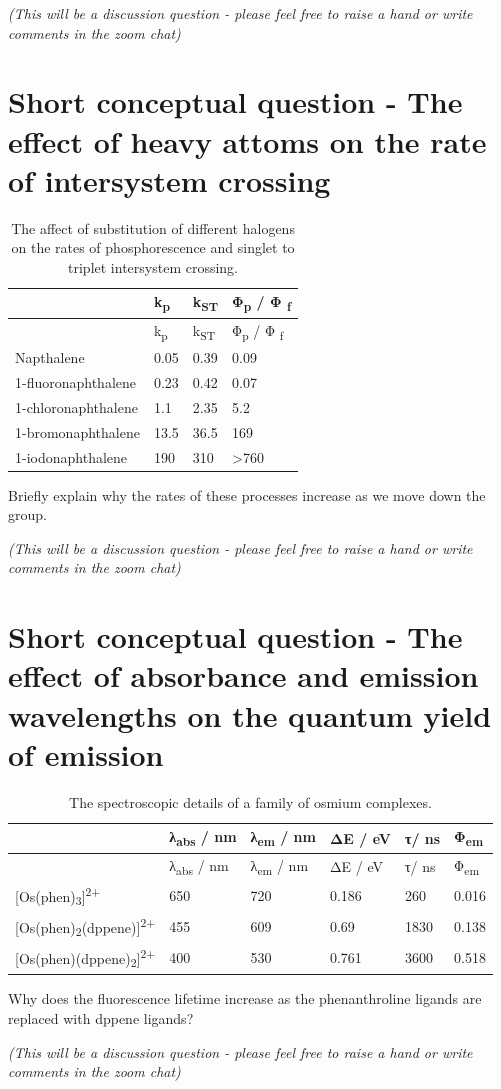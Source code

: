\documentclass[
]{book}
\begin{document}
\emph{(This will be a discussion question - please feel free to raise a hand or write comments in the zoom chat)}

\hypertarget{sec:heavy}{%
\section{Short conceptual question - The effect of heavy attoms on the rate of intersystem crossing}\label{sec:heavy}}

\begin{longtable}[]{@{}llll@{}}
\caption{\label{tab:heavyatom} The affect of substitution of different halogens on the rates of phosphorescence and singlet to triplet intersystem crossing.}\tabularnewline
\toprule
& k\textsubscript{p} & k\textsubscript{ST} & Φ\textsubscript{p} / Φ \textsubscript{f}\tabularnewline
\midrule
\endfirsthead
\toprule
& k\textsubscript{p} & k\textsubscript{ST} & Φ\textsubscript{p} / Φ \textsubscript{f}\tabularnewline
\midrule
\endhead
Napthalene & 0.05 & 0.39 & 0.09\tabularnewline
1-fluoronaphthalene & 0.23 & 0.42 & 0.07\tabularnewline
1-chloronaphthalene & 1.1 & 2.35 & 5.2\tabularnewline
1-bromonaphthalene & 13.5 & 36.5 & 169\tabularnewline
1-iodonaphthalene & 190 & 310 & \textgreater760\tabularnewline
\bottomrule
\end{longtable}

Briefly explain why the rates of these processes increase as we move down the group.

\emph{(This will be a discussion question - please feel free to raise a hand or write comments in the zoom chat)}

\hypertarget{sec:osphen}{%
\section{Short conceptual question - The effect of absorbance and emission wavelengths on the quantum yield of emission}\label{sec:osphen}}

\begin{longtable}[]{@{}llllll@{}}
\caption{\label{tab:osphen} The spectroscopic details of a family of osmium complexes.}\tabularnewline
\toprule
& λ\textsubscript{abs} / nm & λ\textsubscript{em} / nm & ΔE / eV & τ/ ns & Φ\textsubscript{em}\tabularnewline
\midrule
\endfirsthead
\toprule
& λ\textsubscript{abs} / nm & λ\textsubscript{em} / nm & ΔE / eV & τ/ ns & Φ\textsubscript{em}\tabularnewline
\midrule
\endhead
{[}Os(phen)\textsubscript{3}{]}\textsuperscript{2+} & 650 & 720 & 0.186 & 260 & 0.016\tabularnewline
{[}Os(phen)\textsubscript{2}(dppene){]}\textsuperscript{2+} & 455 & 609 & 0.69 & 1830 & 0.138\tabularnewline
{[}Os(phen)(dppene)\textsubscript{2}{]}\textsuperscript{2+} & 400 & 530 & 0.761 & 3600 & 0.518\tabularnewline
\bottomrule
\end{longtable}

Why does the fluorescence lifetime increase as the phenanthroline ligands are replaced with dppene ligands?

\emph{(This will be a discussion question - please feel free to raise a hand or write comments in the zoom chat)}

  
\end{document}

